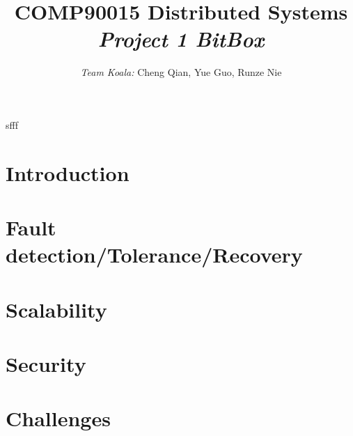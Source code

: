 \documentclass[a4paper,10pt,twocolumn]{article}
\begin{document}
\linespread{1.5}
    \title{
    COMP90015 Distributed Systems \\
    \Large \textit{Project 1 BitBox}}
    \author{\textit{Team Koala:} Cheng Qian, Yue Guo, Runze Nie}
    \date{}
    \maketitle

    \begin{titlepage}
        \begin{center}
            \Large sfff
        \end{center}
    \end{titlepage}
    \section*{Introduction}
   
    
    \section*{Fault detection/Tolerance/Recovery}
    

    \section*{Scalability}
   
    
    \section*{Security}

    \section*{Challenges}
    
    
\end{document}
